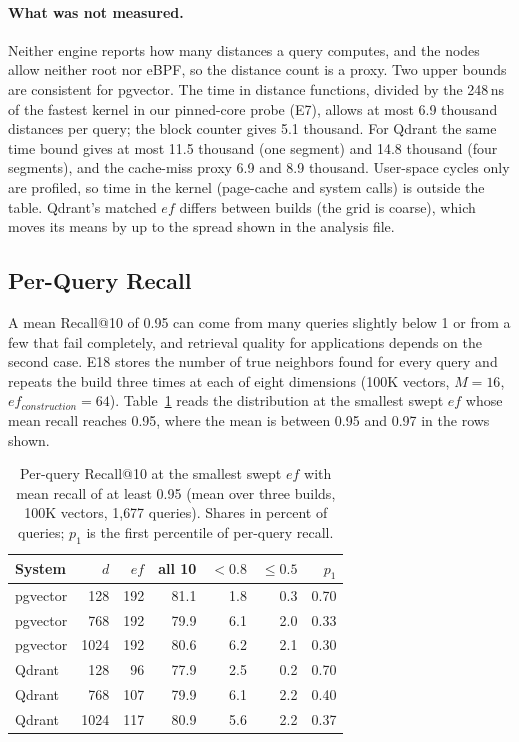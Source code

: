 \documentclass[preprint,12pt]{elsarticle}
\begin{document}
\paragraph{What was not measured.} Neither engine reports how many distances a query computes, and
the nodes allow neither root nor eBPF, so the distance count is a proxy. Two upper bounds are consistent for pgvector. The time in distance
functions, divided by the 248\,ns of the fastest kernel in our pinned-core probe (E7), allows at most 6.9 thousand distances per query;
the block counter gives 5.1 thousand. For Qdrant the same time bound gives at most 11.5 thousand (one segment) and 14.8 thousand
(four segments), and the cache-miss proxy 6.9 and 8.9 thousand. User-space cycles only are profiled, so time in the kernel
(page-cache and system calls) is outside the table. Qdrant's matched $ef$ differs between builds (the grid is coarse), which moves
its means by up to the spread shown in the analysis file.


\subsection{Per-Query Recall}
\label{sec:perquery}

A mean Recall@10 of 0.95 can come from many queries slightly below 1 or from a few that fail
completely, and retrieval quality for applications depends on the second case. E18 stores the
number of true neighbors found for every query and repeats the build three times at each of
eight dimensions (100K vectors, $M=16$, $ef_{construction}=64$). Table~\ref{tab:perquery}
reads the distribution at the smallest swept $ef$ whose mean recall reaches 0.95, where the
mean is between 0.95 and 0.97 in the rows shown.

\begin{table}[t]
  \caption{Per-query Recall@10 at the smallest swept $ef$ with mean recall of at least 0.95
  (mean over three builds, 100K vectors, 1{,}677 queries). Shares in percent of queries;
  $p_1$ is the first percentile of per-query recall.}
  \label{tab:perquery}
  \small
  \begin{tabular}{lr|rrrrr}
    \toprule
    System & $d$ & $ef$ & all 10 & $<0.8$ & $\le 0.5$ & $p_1$ \\
    \midrule
    pgvector & 128 & 192 & 81.1 & 1.8 & 0.3 & 0.70 \\
    pgvector & 768 & 192 & 79.9 & 6.1 & 2.0 & 0.33 \\
    pgvector & 1024 & 192 & 80.6 & 6.2 & 2.1 & 0.30 \\
    \midrule
    Qdrant & 128 & 96 & 77.9 & 2.5 & 0.2 & 0.70 \\
    Qdrant & 768 & 107 & 79.9 & 6.1 & 2.2 & 0.40 \\
    Qdrant & 1024 & 117 & 80.9 & 5.6 & 2.2 & 0.37 \\
    \bottomrule
  \end{tabular}
\end{table}
\end{document}
